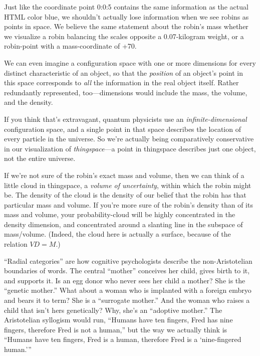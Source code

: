 {
 Just like the coordinate point 0:0:5 contains the same information
as the actual HTML color blue, we shouldn't actually
lose information when we see robins as points in space. We believe the
same statement about the robin's mass whether we
visualize a robin balancing the scales opposite a 0.07-kilogram weight,
or a robin-point with a mass-coordinate of +70.}

{
 We can even imagine a configuration space with one or more
dimensions for every distinct characteristic of an object, so that the
\textit{position} of an object's point in this space
corresponds to \textit{all} the information in the real object itself.
Rather redundantly represented, too---dimensions would include the
mass, the volume, and the density.}

{
 If you think that's extravagant, quantum
physicists use an \textit{infinite-dimensional} configuration space,
and a single point in that space describes the location of every
particle in the universe. So we're actually being
comparatively conservative in our visualization of
\textit{thingspace}{}---a point in thingspace describes just one
object, not the entire universe.}

{
 If we're not sure of the robin's
exact mass and volume, then we can think of a little cloud in
thingspace, a \textit{volume of uncertainty}, within which the robin
might be. The density of the cloud is the density of our belief that
the robin has that particular mass and volume. If
you're more sure of the robin's density
than of its mass and volume, your probability-cloud will be highly
concentrated in the density dimension, and concentrated around a
slanting line in the subspace of mass/volume. (Indeed, the cloud here
is actually a surface, because of the relation $V D = M$.)}

{
 ``Radial categories'' are how
cognitive psychologists describe the non-Aristotelian boundaries of
words. The central ``mother''
conceives her child, gives birth to it, and supports it. Is an egg
donor who never sees her child a mother? She is the
``genetic mother.'' What about a
woman who is implanted with a foreign embryo and bears it to term? She
is a ``surrogate mother.'' And the
woman who raises a child that isn't hers genetically?
Why, she's an ``adoptive
mother.'' The Aristotelian syllogism would run,
``Humans have ten fingers, Fred has nine fingers,
therefore Fred is not a human,'' but the way we
actually think is ``Humans have ten fingers, Fred is a
human, therefore Fred is a `nine-fingered
human.'''}

